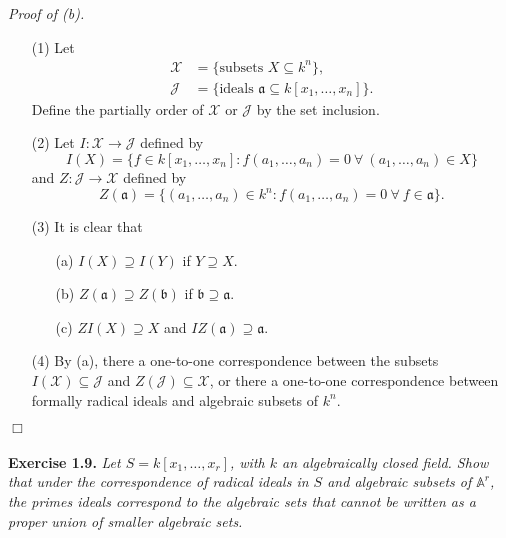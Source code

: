 \documentclass{article}
\begin{document}
\emph{Proof of (b).}
\begin{enumerate}
  \item[(1)]
  Let
  \begin{align*}
    \mathcal{X} &= \{ \text{subsets } X \subseteq k^n \}, \\
    \mathcal{J} &= \{ \text{ideals } \mathfrak{a} \subseteq k[x_1,\ldots,x_n] \}.
  \end{align*}
  Define the partially order of $\mathcal{X}$ or $\mathcal{J}$ by the set inclusion.
  \item[(2)]
  Let $I: \mathcal{X} \to \mathcal{J}$ defined by
  \[
    I(X)
    = \{ f \in k[x_1,\ldots,x_n] : f(a_1,\ldots,a_n) = 0
      \: \forall \: (a_1, \ldots, a_n) \in X \}
  \]
  and $Z: \mathcal{J} \to \mathcal{X}$ defined by
  \[
    Z(\mathfrak{a})
    = \{(a_1, \ldots, a_n) \in k^n : f(a_1,\ldots,a_n) = 0
      \: \forall \: f \in \mathfrak{a} \}.
  \]
  \item[(3)]
  It is clear that
    \begin{enumerate}
    \item[(a)]
      $I(X) \supseteq I(Y)$ if $Y \supseteq X$.
    \item[(b)]
      $Z(\mathfrak{a}) \supseteq Z(\mathfrak{b})$ if $\mathfrak{b} \supseteq \mathfrak{a}$.
    \item[(c)]
      $ZI(X) \supseteq X$ and $IZ(\mathfrak{a}) \supseteq \mathfrak{a}$.
    \end{enumerate}
  \item[(4)]
  By (a),
  there a one-to-one correspondence between
  the subsets $I(\mathcal{X}) \subseteq \mathcal{J}$ and $Z(\mathcal{J}) \subseteq \mathcal{X}$,
  or there a one-to-one correspondence between
  formally radical ideals and algebraic subsets of $k^n$.
\end{enumerate}
$\Box$ \\\\






\textbf{Exercise 1.9.}
\emph{Let $S = k[x_1,\ldots,x_r]$, with $k$ an algebraically closed field.
Show that under the correspondence of radical ideals in $S$ and
algebraic subsets of $\mathbb{A}^r$,
the primes ideals correspond to the algebraic sets that
cannot be written as a proper union of smaller algebraic sets.} \\
\end{document}
